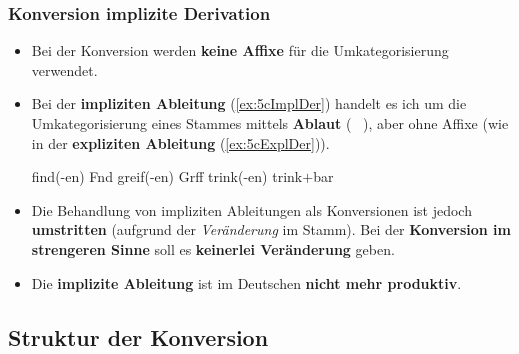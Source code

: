 \begin{frame}
\frametitle{Konversion \vs implizite Derivation}

\begin{itemize}
\item Bei der Konversion werden \textbf{keine Affixe} für die Umkategorisierung verwendet.

\item Bei der \textbf{impliziten Ableitung} (\ref{ex:5cImplDer}) handelt es ich um die Umkategorisierung eines Stammes mittels \textbf{Ablaut} (\zB\ \textipa{[I]} \ras \textipa{[U]}), aber ohne Affixe (wie in der \textbf{expliziten Ableitung} (\ref{ex:5cExplDer})).

\ea \label{ex:5cImplDer}
\ea {}find(-en) \ras {}Fnd
\ex {}greif(-en) \ras {}Grff
\z 
\ex \label{ex:5cExplDer} trink(-en) \ras {}trink$+$bar	
\z 

\item Die Behandlung von impliziten Ableitungen als Konversionen ist jedoch \textbf{umstritten} (aufgrund der \emph{Veränderung} im Stamm). Bei der \textbf{Konversion im strengeren Sinne} soll es \textbf{keinerlei Veränderung} geben.

\item Die \textbf{implizite Ableitung} ist im Deutschen \textbf{nicht mehr produktiv}.
\end{itemize}

\end{frame}


\subsection{Struktur der Konversion}

